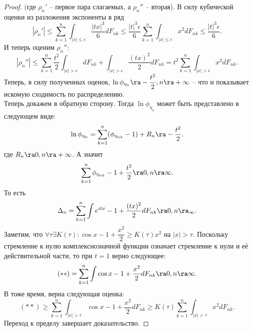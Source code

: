 \begin{proof}
    (где $\rho_n'$ -- первое пара слагаемых, а $\rho_n''$ -- вторая).
    В силу кубической оценки из разложения экспоненты в ряд
    \[
        |\rho_n'| \leq \sum\limits_{k = 1}^{n}\int_{|x| \leq \epsilon} \dfrac{|tx|^3}{6}dF_{nk} \leq \dfrac{|t|^3\epsilon}{6}\sum\limits_{k = 1}^{n} \int_{|x| \leq \epsilon} x^2 dF_{nk} \leq \dfrac{|t|^3 \epsilon}{6}.
    \]
    И теперь оценим $\rho_n''$:
    \[
        |\rho_n''| \leq \sum\limits_{k = 1}^{n} \dfrac{t^2}{2} \int_{|x| > \epsilon} dF_{nk} + \int_{|x| > \epsilon} \dfrac{(tx)^2}{2}dF_{nk} = t^2 \sum\limits_{k = 1}^{n}\int_{|x| > \epsilon} x^2 dF_{nk}.
    \]
    Теперь, в силу полученных оценок, $\ln \phi_{\eta_n} \ra -\dfrac{t^2}{2}, n \ra +\infty$ -- что и показывает искомую сходимость по распределению. \\
    Теперь докажем в обратную сторону.
    Тогда $\ln \phi_{\eta_n}$ может быть представлено в следующем виде:
    \[
        \ln \phi_{\eta_n} = \sum\limits_{k = 1}^{n} (\phi_{\eta_{nk}} - 1) + R_n \ra -\dfrac{t^2}{2}.
    \]
    где $R_n \ra 0, n \ra +\infty$.
    А значит
    \[
        \sum\limits_{k = 1}^{n} \phi_{\eta_{nk}} - 1 + \dfrac{t^2}{2} \ra 0, n \ra \infty.
    \]
    То есть
    \[
        \Delta_n = \sum\limits_{k = 1}^{n} \int e^{itx} - 1 + \dfrac{(tx)^2}{2} dF_{nk} \ra 0, n \ra _{\infty}.
    \]
    Заметим, что $\forall \tau \exists K(\tau): \cos x - 1 + \dfrac{x^2}{2} \geq K(\tau)x^2$ на $|x| > \tau$.
    Поскольку стремление к нулю комплекснозначной функции означает стремление к нули и её действительной части, то при $t = 1$ верно следующее:
    \[
        (**) =\sum\limits_{k = 1}^{n} \int \cos x - 1 + \dfrac{x^2}{2} dF_{nk} \ra 0, n \ra \infty.
    \]
    В тоже время, верна следующая оценка:
    \[
        (**) \geq \sum\limits_{k = 1}^{n} \int_{|x| > \tau} \cos x - 1 + \dfrac{x^2}{2} dF_{nk} \geq K(\tau) \sum\limits_{k = 1}^{n} \int_{|x| > \tau} x^2 dF_{nk}.
    \]
    Переход к пределу завершает доказательство.
\end{proof}
